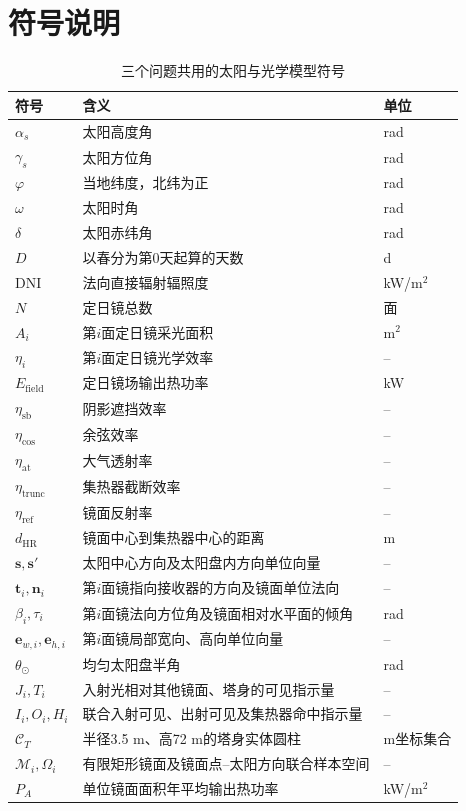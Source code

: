 \section{符号说明}
\begin{table}[H]
\centering
\caption{三个问题共用的太阳与光学模型符号}
\begin{tabularx}{\textwidth}{>{\centering\arraybackslash}p{}L>{\centering\arraybackslash}p{0.14\textwidth}}
\toprule
符号 & 含义 & 单位 \\
\midrule
$\alpha_s$ & 太阳高度角 & rad \\
$\gamma_s$ & 太阳方位角 & rad \\
$\varphi$ & 当地纬度，北纬为正 & rad \\
$\omega$ & 太阳时角 & rad \\
$\delta$ & 太阳赤纬角 & rad \\
$D$ & 以春分为第0天起算的天数 & d \\
$\mathrm{DNI}$ & 法向直接辐射辐照度 & kW/m$^2$ \\
$N$ & 定日镜总数 & 面 \\
$A_i$ & 第$i$面定日镜采光面积 & m$^2$ \\
$\eta_i$ & 第$i$面定日镜光学效率 & -- \\
$E_{\mathrm{field}}$ & 定日镜场输出热功率 & kW \\
$\eta_{\mathrm{sb}}$ & 阴影遮挡效率 & -- \\
$\eta_{\cos}$ & 余弦效率 & -- \\
$\eta_{\mathrm{at}}$ & 大气透射率 & -- \\
$\eta_{\mathrm{trunc}}$ & 集热器截断效率 & -- \\
$\eta_{\mathrm{ref}}$ & 镜面反射率 & -- \\
$d_{\mathrm{HR}}$ & 镜面中心到集热器中心的距离 & m \\
$\boldsymbol{s},\boldsymbol{s}'$ & 太阳中心方向及太阳盘内方向单位向量 & -- \\
$\boldsymbol{t}_i,\boldsymbol{n}_i$ & 第$i$面镜指向接收器的方向及镜面单位法向 & -- \\
$\beta_i,\tau_i$ & 第$i$面镜法向方位角及镜面相对水平面的倾角 & rad \\
$\boldsymbol{e}_{w,i},\boldsymbol{e}_{h,i}$ & 第$i$面镜局部宽向、高向单位向量 & -- \\
$\theta_\odot$ & 均匀太阳盘半角 & rad \\
$J_i,T_i$ & 入射光相对其他镜面、塔身的可见指示量 & -- \\
$I_i,O_i,H_i$ & 联合入射可见、出射可见及集热器命中指示量 & -- \\
$\mathcal{C}_T$ & 半径3.5 m、高72 m的塔身实体圆柱 & m坐标集合 \\
$\mathcal{M}_i,\Omega_i$ & 有限矩形镜面及镜面点--太阳方向联合样本空间 & -- \\
$P_A$ & 单位镜面面积年平均输出热功率 & kW/m$^2$ \\
\bottomrule
\end{tabularx}
\end{table}

